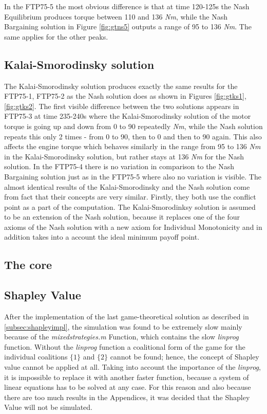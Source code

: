 In the FTP75-5 the most obvious difference is that at time 120-125s the Nash Equilibrium produces torque between 110 and 136 \textit{Nm}, while the Nash Bargaining solution in Figure \ref{fig:gtns5} outputs a range of 95 to 136 \textit{Nm}. The same applies for the other peaks.

\subsection{Kalai-Smorodinsky solution}
The Kalai-Smorodinsky solution produces exactly the same results for the FTP75-1, FTP75-2 as the Nash solution does as shown in Figures \ref{fig:gtks1}, \ref{fig:gtks2}. The first visible difference between the two solutions appears in FTP75-3 at time 235-240s where the Kalai-Smorodinsky solution of the motor torque is going up and down from 0 to 90 repeatedly \textit{Nm}, while the Nash solution repeats this only 2 times - from 0 to 90, then to 0 and then to 90 again. This also affects the engine torque which behaves similarly in the range from 95 to 136 \textit{Nm} in the Kalai-Smorodinsky solution, but rather stays at 136 \textit{Nm} for the Nash solution. In the FTP75-4 there is no variation in comparison to the Nash Bargaining solution just as in the FTP75-5 where also no variation is visible. The almost identical results of the Kalai-Smorodinsky and the Nash solution come from fact that their concepts are very similar. Firstly, they both use the conflict point as a part of the computation. The Kalai-Smorodinksy solution is assumed to be an extension of the Nash solution, because it replaces one of the four axioms of the Nash solution with a new axiom for Individual Monotonicity and in addition takes into a account the ideal minimum payoff point.

\subsection{The core}

\subsection{Shapley Value}
After the implementation of the last game-theoretical solution as described in \ref{subsec:shapleyimpl}, the simulation was found to be extremely slow mainly because of the \textit{mixedstrategies.m} Function, which contains the slow \textit{linprog} function. Without the \textit{linprog} function a coalitional form of the game for the individual coalitions $\{1\}$ and $\{2\}$ cannot be found; hence, the concept of Shapley value cannot be applied at all. Taking into account the importance of the \textit{linprog}, it is impossible to replace it with another faster function, because a system of linear equations has to be solved at any case. For this reason and also because there are too much results in the Appendices, it was decided that the Shapley Value will not be simulated.



